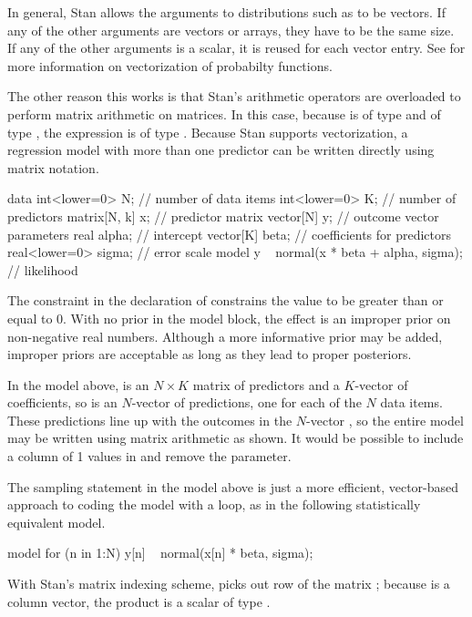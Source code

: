 In general, Stan allows the arguments to distributions such as
 to be vectors.  If any of the other arguments are
vectors or arrays, they have to be the same size.  If any of the other
arguments is a scalar, it is reused for each vector entry.  See
 for more information on vectorization of
probabilty functions.

The other reason this works is that Stan's arithmetic operators are
overloaded to perform matrix arithmetic on matrices.  In this case,
because  is of type  and  of type
, the expression  is of type .
Because Stan supports vectorization, a regression model with more than
one predictor can be written directly using matrix notation.
%
\begin{stancode}
data {
  int<lower=0> N;   // number of data items
  int<lower=0> K;   // number of predictors
  matrix[N, k] x;    // predictor matrix
  vector[N] y;      // outcome vector
}
parameters {
  real alpha;           // intercept
  vector[K] beta;       // coefficients for predictors
  real<lower=0> sigma;  // error scale
}
model {
  y ~ normal(x * beta + alpha, sigma);  // likelihood
}
\end{stancode}
%
The constraint  in the declaration of 
constrains the value to be greater than or equal to 0.  With no prior
in the model block, the effect is an improper prior on non-negative
real numbers.  Although a more informative prior may be added, improper
priors are acceptable as long as they lead to proper posteriors.

In the model above,  is an $N \times K$ matrix of predictors
and  a $K$-vector of coefficients, so  is an
$N$-vector of predictions, one for each of the $N$ data items.  These
predictions line up with the outcomes in the $N$-vector , so
the entire model may be written using matrix arithmetic as shown.  It
would be possible to include a column of 1 values in  and
remove the  parameter.  

The sampling statement in the model above is just a more efficient,
vector-based approach to coding the model with a loop, as in the
following statistically equivalent model.
%
\begin{stancode}
model {
  for (n in 1:N)
    y[n] ~ normal(x[n] * beta, sigma);
}
\end{stancode}
%
With Stan's matrix indexing scheme,  picks out row 
of the matrix ;  because  is a column vector, 
the product  is a scalar of type .

